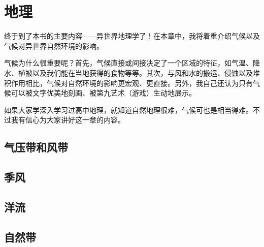 \chapter{地理}
终于到了本书的主要内容------异世界地理学了！在本章中，我将着重介绍气候以及气候对异世界自然环境的影响。

气候为什么很重要呢？首先，气候直接或间接决定了一个区域的特征，如气温、降水、植被以及我们能在当地获得的食物等等。其次，与风和水的搬运、侵蚀以及堆积作用相比，气候对自然环境的影响更宏观、更直接。另外，我自己还认为只有气候可以被文字优美地刻画、被第九艺术（游戏）生动地展示。

如果大家学深入学习过高中地理，就知道自然地理很难，气候可也是相当得难。不过我有信心为大家讲好这一章的内容。

\section{气压带和风带}

\section{季风}

\section{洋流}

\section{自然带}
